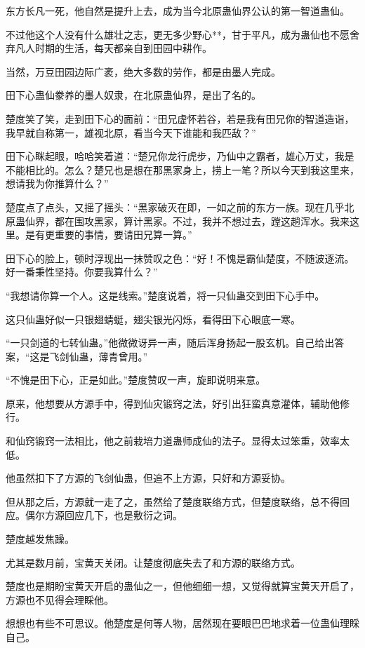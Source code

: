 \begin{this_body}
东方长凡一死，他自然是提升上去，成为当今北原蛊仙界公认的第一智道蛊仙。

不过他这个人没有什么雄壮之志，更无多少野心**，甘于平凡，成为蛊仙也不愿舍弃凡人时期的生活，每天都亲自到田园中耕作。

当然，万豆田园边际广袤，绝大多数的劳作，都是由墨人完成。

田下心蛊仙豢养的墨人奴隶，在北原蛊仙界，是出了名的。

楚度笑了笑，走到田下心的面前：“田兄虚怀若谷，若是我有田兄你的智道造诣，我早就自称第一，雄视北原，看当今天下谁能和我匹敌？”

田下心眯起眼，哈哈笑着道：“楚兄你龙行虎步，乃仙中之霸者，雄心万丈，我是不能相比的。怎么？楚兄也是想在那黑家身上，捞上一笔？所以今天到我这里来，想请我为你推算什么？”

楚度点了点头，又摇了摇头：“黑家破灭在即，一如之前的东方一族。现在几乎北原蛊仙界，都在围攻黑家，算计黑家。不过，我并不想过去，蹚这趟浑水。我来这里。是有更重要的事情，要请田兄算一算。”

田下心的脸上，顿时浮现出一抹赞叹之色：“好！不愧是霸仙楚度，不随波逐流。好一番秉性坚持。你要我算什么？”

“我想请你算一个人。这是线索。”楚度说着，将一只仙蛊交到田下心手中。

这只仙蛊好似一只银翅蜻蜓，翅尖银光闪烁，看得田下心眼底一寒。

“一只剑道的七转仙蛊。”他微微讶异一声，随后浑身扬起一股玄机。自己给出答案，“这是飞剑仙蛊，薄青曾用。”

“不愧是田下心，正是如此。”楚度赞叹一声，旋即说明来意。

原来，他想要从方源手中，得到仙灾锻窍之法，好引出狂蛮真意灌体，辅助他修行。

和仙窍锻窍一法相比，他之前栽培力道蛊师成仙的法子。显得太过笨重，效率太低。

他虽然扣下了方源的飞剑仙蛊，但追不上方源，只好和方源妥协。

但从那之后，方源就一走了之，虽然给了楚度联络方式，但楚度联络，总不得回应。偶尔方源回应几下，也是敷衍之词。

楚度越发焦躁。

尤其是数月前，宝黄天关闭。让楚度彻底失去了和方源的联络方式。

楚度也是期盼宝黄天开启的蛊仙之一，但他细细一想，又觉得就算宝黄天开启了，方源也不见得会理睬他。

想想也有些不可思议。他楚度是何等人物，居然现在要眼巴巴地求着一位蛊仙理睬自己。


\end{this_body}
